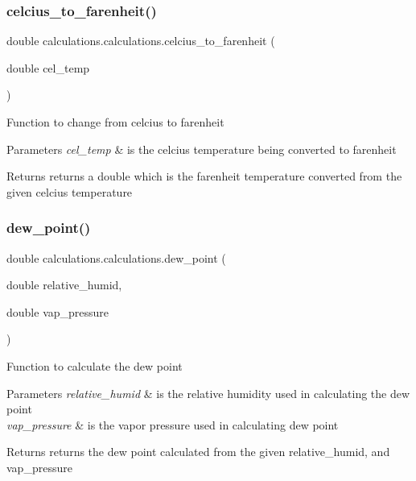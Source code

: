 \subsubsection{\texorpdfstring{celcius\+\_\+to\+\_\+farenheit()}{celcius\_to\_farenheit()}}
{\footnotesize\ttfamily double calculations.\+calculations.\+celcius\+\_\+to\+\_\+farenheit (\begin{DoxyParamCaption}\item[{double}]{cel\+\_\+temp }\end{DoxyParamCaption})\hspace{0.3cm}{\ttfamily [inline]}}

Function to change from celcius to farenheit 
\begin{DoxyParams}{Parameters}
{\em cel\+\_\+temp} & is the celcius temperature being converted to farenheit \\
\hline
\end{DoxyParams}
\begin{DoxyReturn}{Returns}
returns a double which is the farenheit temperature converted from the given celcius temperature 
\end{DoxyReturn}
\mbox{\label{classcalculations_1_1calculations_a37b4b4129f95710ac3ed3598d749971c}} 
\subsubsection{\texorpdfstring{dew\+\_\+point()}{dew\_point()}}
{\footnotesize\ttfamily double calculations.\+calculations.\+dew\+\_\+point (\begin{DoxyParamCaption}\item[{double}]{relative\+\_\+humid,  }\item[{double}]{vap\+\_\+pressure }\end{DoxyParamCaption})\hspace{0.3cm}{\ttfamily [inline]}}

Function to calculate the dew point 
\begin{DoxyParams}{Parameters}
{\em relative\+\_\+humid} & is the relative humidity used in calculating the dew point \\
\hline
{\em vap\+\_\+pressure} & is the vapor pressure used in calculating dew point \\
\hline
\end{DoxyParams}
\begin{DoxyReturn}{Returns}
returns the dew point calculated from the given relative\+\_\+humid, and vap\+\_\+pressure 
\end{DoxyReturn}
\mbox{\label{classcalculations_1_1calculations_ab85048dd6fa5d535ea173d996b3968c1}} 
